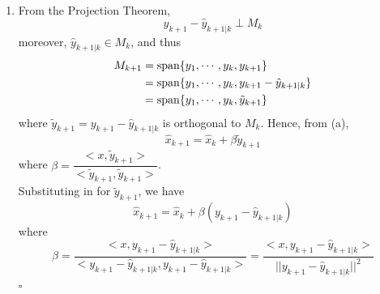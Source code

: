 \documentclass[letterpaper]{article}
\begin{document}
\begin{enumerate}
\begin{equation*}
\begin{split}
\begin{array}{c}
        <y_{k+1}, y_{k+1}>\alpha_{k+1,k+1}=<x, y_{k+1}>
      \end{array}
    \right.
  \end{split}.
\end{equation*}
Thus, $[\alpha_{k+1}]_{1:k}=(G_{k}^{\top})^{-1}\beta_{k}=\alpha_{k}$ and $\alpha_{k+1,k+1}=\dfrac{<x, y_{k+1}>}{<y_{k+1}, y_{k+1}>}$, leading to
\begin{align*}
  \hat{x}_{k+1} &= \alpha_{k,1}y_{1}+\alpha_{k,2}y_{2}+\ldots+\alpha_{k,k}y_{k}+\dfrac{<x, y_{k+1}>}{<y_{k+1}, y_{k+1}>} y_{k+1} \\
   &=\hat{x}_{k}+\dfrac{<x, y_{k+1}>}{||y_{k+1}||^2} y_{k+1}.
\end{align*}

\item From the Projection Theorem,
$$y_{k+1}-\hat{y}_{k+1|k} \perp M_k$$
moreover, $\hat{y}_{k+1|k} \in M_k$, and thus
$$\begin{aligned}
M_{k+1}&=\textrm{span} \{ y_1,\cdots,y_k,y_{k+1} \} \\
&=\textrm{span} \{ y_1,\cdots,y_k,y_{k+1}-\hat{y}_{k+1|k} \} \\
&=\textrm{span} \{ y_1,\cdots,y_k,\tilde{y}_{k+1} \}
\end{aligned}$$
where $\tilde{y}_{k+1}=y_{k+1}-\hat{y}_{k+1|k}$ is orthogonal to $M_k$. Hence, from (a),
$$\hat{x}_{k+1}=\hat{x}_k + \beta \tilde{y}_{k+1}$$
where $\beta = \dfrac{<x,\tilde{y}_{k+1}>}{<\tilde{y}_{k+1},\tilde{y}_{k+1}>}$.\\[2ex]
Substituting in for $\tilde{y}_{k+1}$, we have
$$\hat{x}_{k+1}=\hat{x}_k + \beta (y_{k+1}-\hat{y}_{k+1|k})$$
where $$\beta=\dfrac{<x,y_{k+1}-\hat{y}_{k+1|k}>}{<y_{k+1}-\hat{y}_{k+1|k},y_{k+1}-\hat{y}_{k+1|k}>}=\dfrac{<x,y_{k+1}-\hat{y}_{k+1|k}>}{||y_{k+1}-\hat{y}_{k+1|k}||^2}$$
\hfill $\square$ \\ [4ex]
\end{enumerate}
\end{document}
